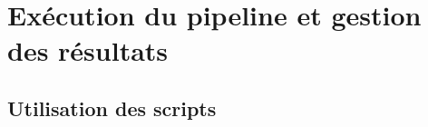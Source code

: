 \renewcommand{\chpath}{4-pipeline/}
\renewcommand{\imgpath}{\chpath img/}
\renewcommand{\secpath}{\chpath}
\chapter{Exécution du pipeline et gestion des résultats}
\label{chap:briques}


\section{Utilisation des scripts}

%





%

